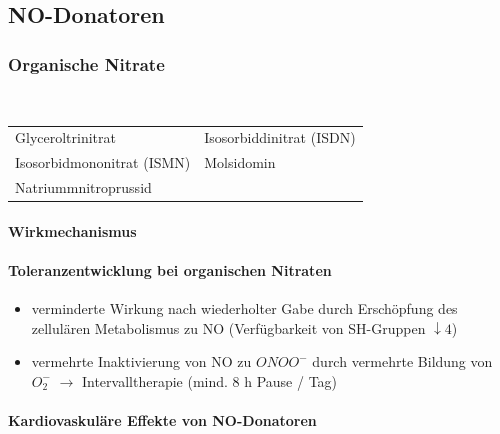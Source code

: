 \documentclass[10pt,a4paper]{report}
\begin{document}
\subsection{NO-Donatoren}
\subsubsection{Organische Nitrate} \mbox{} \\

\begin{tabularx}{\textwidth}{XX}
Glyceroltrinitrat&Isosorbiddinitrat (ISDN)\\
Isosorbidmononitrat (ISMN)&Molsidomin\\
Natriummnitroprussid&\\
\end{tabularx}

\paragraph{Wirkmechanismus}

\paragraph{Toleranzentwicklung bei organischen Nitraten}

\begin{itemize}
	\item verminderte Wirkung nach wiederholter Gabe durch Erschöpfung des zellulären Metabolismus zu NO (Verfügbarkeit von SH-Gruppen $\downarrow4$)
	\item vermehrte Inaktivierung von NO zu $ONOO^-$ durch vermehrte Bildung von $O_2^-$ $\rightarrow$ Intervalltherapie (mind. 8 h Pause / Tag)
\end{itemize}

\paragraph{Kardiovaskuläre Effekte von NO-Donatoren}
\end{document}

